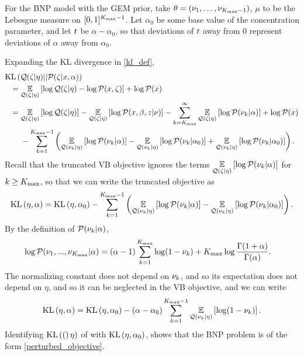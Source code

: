 \begin{ex}
%
For the BNP model with the GEM prior, take $\theta = (\nu_1, \ldots,
\nu_{{K_{\mathrm{max}}}-1})$, $\mu$ to be the Lebesgue measure on $[0,1]^{{K_{\mathrm{max}}}-1}$.
Let $\alpha_0$ be some base value of the concentration parameter, and
let $t$ be $\alpha - \alpha_0$, so that deviations of $t$ away from
$0$ represent deviations of $\alpha$ away from $\alpha_0$.

Expanding the KL divergence in \eqref{kl_def},
%
\begin{align*}
%
\MoveEqLeft
\KL{\q(\zeta \vert \eta) || \p(\zeta \vert \x, \alpha)}
\\={}&    \expect{\q(\zeta \vert \eta)}{
        \log \q(\zeta \vert \eta) - \logp(\x, \zeta)} + \logp(\x)
\\={}&    \expect{\q(\zeta \vert \eta)}{\log \q(\zeta \vert \eta)} -
        \expect{\q(\zeta \vert \eta)}
               {\log \p(\x, \beta, \z \vert \nu )} -
               \sum_{\k = \kmax}^\infty
                \expect{\q(\zeta \vert \eta)}{\log \p(\nuk \vert \alpha)}
               +\logp(\x)
\\{}& -\sum_{\k=1}^{\kmax - 1}
            \left(
                \expect{\q(\nuk \vert \eta)}{\log \p(\nuk \vert \alpha)} -
                \expect{\q(\nuk \vert \eta)}{\log \p(\nuk \vert \alpha_0)} +
                \expect{\q(\nuk \vert \eta)}{\log \p(\nuk \vert \alpha_0)}
             \right).
%
\end{align*}
%
Recall that the truncated VB objective ignores the terms
$\underset{\mathcal{Q}(\zeta \vert \eta)}{\mathbb{E}}\left[\log \mathcal{P}(\nu_{k} \vert \alpha)\right]$ for $k \ge {K_{\mathrm{max}}}$,
so that we can write the truncated objective as
%
\begin{align*}
%
\KL{\eta, \alpha} = \KL{\eta, \alpha_0}
-\sum_{\k=1}^{\kmax - 1}
            \left(
                \expect{\q(\nuk \vert \eta)}{\log \p(\nuk \vert \alpha)} -
                \expect{\q(\nuk \vert \eta)}{\log \p(\nuk \vert \alpha_0)}
             \right).
%
\end{align*}
%
By the definition of $\mathcal{P}(\nu_{k} \vert \alpha)$,
%
\begin{align*}
%
\log \p(\nu_1, ..., \nu_\kmax \vert \alpha)
    ={}& (\alpha - 1) \sum_{k=1}^\kmax \log (1 - \nuk)
    + \kmax \log \frac{\Gamma(1 + \alpha)}{\Gamma(\alpha)}.
%
\end{align*}
%
The normalizing constant does not depend on $\nu_{k}$, and so its expectation
does not depend on $\eta$, and so it can be neglected in the VB objective,
and we can write
%
\begin{align*}
%
\KL{\eta, \alpha} = \KL{\eta, \alpha_0}
-(\alpha - \alpha_0) \sum_{\k=1}^{\kmax - 1}
    \expect{\q(\nuk \vert \eta)}{\log (1 - \nuk)}.
%
\end{align*}
%
Identifying $\mathrm{KL}\left((\right)\eta)$ of  with $\mathrm{KL}\left(\eta, \alpha_0\right)$,
shows that the BNP problem is of the form \eqref{perturbed_objective}.
%
\end{ex}
